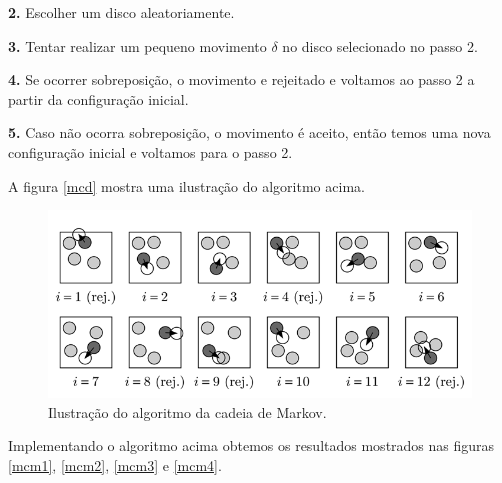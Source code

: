 \documentclass[%
reprint,
amsmath,amssymb,
aps,
12pt
]{revtex4-1}
\begin{document}
\textbf{2.} Escolher um disco aleatoriamente.

\textbf{3.} Tentar realizar um pequeno movimento $ \delta $ no disco selecionado no passo 2.

\textbf{4.} Se ocorrer sobreposição, o movimento e rejeitado e voltamos ao passo 2 a partir da configuração inicial. 

\textbf{5.} Caso não ocorra sobreposição, o movimento é aceito, então temos uma nova configuração inicial e voltamos para o passo 2.

A figura \ref{mcd} mostra uma ilustração do algoritmo acima.

\begin{figure}[!h]
	\centering
	\includegraphics[scale=0.4]{mcm.png}
	\caption{Ilustração do algoritmo da cadeia de Markov.
	\label{mcm}}
\end{figure}

Implementando o algoritmo acima obtemos os resultados mostrados nas figuras \ref{mcm1}, \ref{mcm2}, \ref{mcm3} e \ref{mcm4}.
\end{document}
